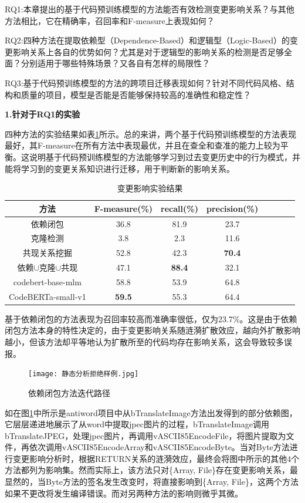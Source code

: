 RQ1:本章提出的基于代码预训练模型的方法能否有效检测变更影响关系？与其他方法相比，它在精确率，召回率和F-measure上表现如何？

RQ2:四种方法在提取依赖型（Dependence-Based）和逻辑型（Logic-Based）的变更影响关系上各自的优势如何？尤其是对于逻辑型的影响关系的检测是否足够全面？分别适用于哪些特殊场景？又各自有怎样的局限性？

RQ3:基于代码预训练模型的方法的跨项目迁移表现如何？针对不同代码风格、结构和质量的项目，模型是否能是否能够保持较高的准确性和稳定性？

\textbf{1.针对于RQ1的实验}

四种方法的实验结果如表\ref{1_变更影响实验结果}所示。总的来讲，两个基于代码预训练模型的方法表现最好，其F-measure在所有方法中表现最优，并且在查全和查准的能力上较为平衡。这说明基于代码预训练模型的方法能够学习到过去变更历史中的行为模式，并能将学习到的变更关系知识进行迁移，用于判断新的影响关系。

\begin{table}[htbp]
\caption{变更影响实验结果}
\label{1_变更影响实验结果}
\vspace{0.5em}\centering\wuhao
\begin{tabular}{cccccccc}
\toprule
方法 & F-measure(\%) & recall(\%) & precision(\%)  \\
\midrule
依赖闭包 & 36.8&81.9&23.7  \\
克隆检测 & 3.8&2.3&11.6 \\
共现关系挖掘 & 52.8&42.3&\textbf{70.4} \\
依赖$\cup$克隆$\cup$共现 & 47.1&\textbf{88.4}&32.1 \\
codebert-base-mlm & 58.8&53.9&64.8 \\
CodeBERTa-small-v1 & \textbf{59.5} & 55.3 & 64.4 \\
\bottomrule
\end{tabular}
\end{table}

基于依赖闭包的方法表现为召回率较高而准确率很低，仅为23.7\%。这是由于依赖闭包方法本身的特性决定的，由于变更影响关系随涟漪扩散效应，越向外扩散影响越小，但该方法却平等地认为扩散所至的代码均存在影响关系，这会导致较多误报。

\begin{figure}[htbp]
\centering
\texttt{[image: 静态分析拒绝样例.jpg]}
\caption{依赖闭包方法迭代路径}
\label{1_依赖闭包方法迭代路径}
\end{figure}

如在图\ref{1_依赖闭包方法迭代路径}中所示是antiword项目中从bTranslateImage方法出发得到的部分依赖图，它层层递进地展示了从word中提取jpec图片的过程，bTranslateImage调用bTranslateJPEG，处理jpec图片，再调用vASCII85EncodeFile，将图片提取为文件，再依次调用vASCII85EncodeArray和vASCII85EncodeByte。当对Byte方法进行变更影响分析时，根据RETURN关系的涟漪效应，最终会将图中所示的其他4个方法都列为影响集。然而实际上，该方法只对\{Array, File\}存在变更影响关系，最显然的，当Byte方法的签名发生改变时，将直接影响到\{Array, File\}，这两个方法如果不更改将发生编译错误。而对另两种方法的影响则微乎其微。

